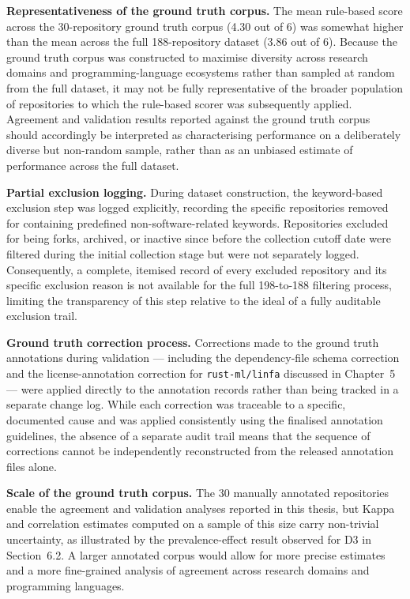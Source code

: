 \textbf{Representativeness of the ground truth corpus.} The mean
rule-based score across the 30-repository ground truth corpus (4.30
out of 6) was somewhat higher than the mean across the full
188-repository dataset (3.86 out of 6). Because the ground truth
corpus was constructed to maximise diversity across research domains
and programming-language ecosystems rather than sampled at random
from the full dataset, it may not be fully representative of the
broader population of repositories to which the rule-based scorer
was subsequently applied. Agreement and validation results reported
against the ground truth corpus should accordingly be interpreted as
characterising performance on a deliberately diverse but non-random
sample, rather than as an unbiased estimate of performance across
the full dataset.

\textbf{Partial exclusion logging.} During dataset construction, the
keyword-based exclusion step was logged explicitly, recording the
specific repositories removed for containing predefined
non-software-related keywords. Repositories excluded for being forks,
archived, or inactive since before the collection cutoff date were
filtered during the initial collection stage but were not separately
logged. Consequently, a complete, itemised record of every excluded
repository and its specific exclusion reason is not available for
the full 198-to-188 filtering process, limiting the transparency of
this step relative to the ideal of a fully auditable exclusion trail.

\textbf{Ground truth correction process.} Corrections made to the
ground truth annotations during validation --- including the
dependency-file schema correction and the license-annotation
correction for \texttt{rust-ml/linfa} discussed in Chapter~5 --- were
applied directly to the annotation records rather than being tracked
in a separate change log. While each correction was traceable to a
specific, documented cause and was applied consistently using the
finalised annotation guidelines, the absence of a separate audit
trail means that the sequence of corrections cannot be independently
reconstructed from the released annotation files alone.

\textbf{Scale of the ground truth corpus.} The 30 manually annotated
repositories enable the agreement and validation analyses reported in
this thesis, but Kappa and correlation estimates computed on a sample
of this size carry non-trivial uncertainty, as illustrated by the
prevalence-effect result observed for D3 in Section~6.2. A larger
annotated corpus would allow for more precise estimates and a more
fine-grained analysis of agreement across research domains and
programming languages.

